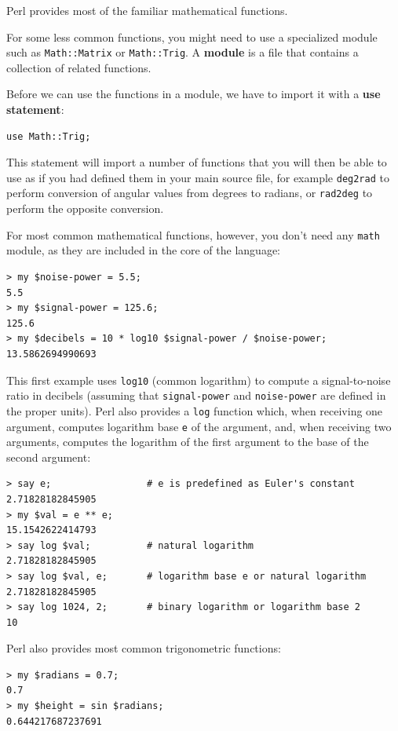 Perl provides most of the familiar mathematical functions.

For some less common functions, you might need to use a 
specialized module such as \verb'Math::Matrix' or 
\verb'Math::Trig'.  A {\bf module} is a file that contains a
collection of related functions.

Before we can use the functions in a module, we have to import it with
a {\bf use statement}:

\begin{verbatim}
use Math::Trig;
\end{verbatim}
%
This statement will import a number of functions that you will then be able to use as if you had defined them in your main source file, for example \verb'deg2rad' to perform conversion of angular values from degrees to radians, or \verb'rad2deg' to perform the opposite conversion.

For most common mathematical functions, however, you don't need any \verb'math' module, as they are included in the core of the language:

\begin{verbatim}
> my $noise-power = 5.5;
5.5
> my $signal-power = 125.6;
125.6
> my $decibels = 10 * log10 $signal-power / $noise-power;
13.5862694990693
\end{verbatim}
%
This first example uses \verb"log10" (common logarithm) 
to compute a signal-to-noise ratio in decibels 
(assuming that \verb"signal-power" and
\verb"noise-power" are defined in the proper units).  Perl 
also provides a {\tt log} function which, when receiving 
one argument, computes logarithm base {\tt e} of the argument, 
and, when receiving two arguments, computes the logarithm 
of the first argument to the base of the second argument:

\begin{verbatim}
> say e;                 # e is predefined as Euler's constant
2.71828182845905
> my $val = e ** e;
15.1542622414793
> say log $val;          # natural logarithm
2.71828182845905
> say log $val, e;       # logarithm base e or natural logarithm
2.71828182845905
> say log 1024, 2;       # binary logarithm or logarithm base 2
10
\end{verbatim}
%


Perl also provides most common trigonometric functions:

\begin{verbatim}
> my $radians = 0.7;
0.7
> my $height = sin $radians;
0.644217687237691
\end{verbatim}

